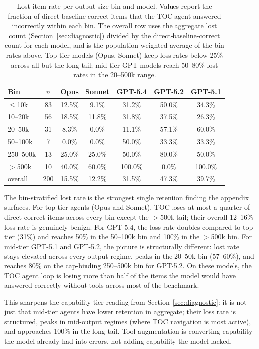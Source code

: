 \documentclass{article}
\begin{document}
\begin{table}[h]
\centering
\small
\setlength{\tabcolsep}{6pt}
\begin{tabular}{lcccccc}
\toprule
Bin & $n$ & Opus & Sonnet & GPT-5.4 & GPT-5.2 & GPT-5.1 \\
\midrule
$\le$10k & 83 & 12.5\% & 9.1\% & 31.2\% & 50.0\% & 34.3\% \\
10--20k & 56 & 18.5\% & 11.8\% & 31.8\% & 37.5\% & 26.3\% \\
20--50k & 31 & 8.3\% & 0.0\% & 11.1\% & 57.1\% & 60.0\% \\
50--100k & 7 & 0.0\% & 0.0\% & 50.0\% & 33.3\% & 33.3\% \\
250--500k & 13 & 25.0\% & 25.0\% & 50.0\% & 80.0\% & 50.0\% \\
$>$500k & 10 & 40.0\% & 60.0\% & 100.0\% & 0.0\% & 100.0\% \\
\midrule
overall & 200 & 15.5\% & 12.2\% & 31.5\% & 47.3\% & 39.7\% \\
\bottomrule
\end{tabular}
\caption{Lost-item rate per output-size bin and model. Values report the fraction of direct-baseline-correct items that the TOC agent answered incorrectly within each bin. The overall row uses the aggregate lost count (Section~\ref{sec:diagnostic}) divided by the direct-baseline-correct count for each model, and is the population-weighted average of the bin rates above. Top-tier models (Opus, Sonnet) keep loss rates below 25\% across all but the long tail; mid-tier GPT models reach 50--80\% lost rates in the 20--500k range.}
\label{tab:appendix-retention-by-bin}
\end{table}

The bin-stratified lost rate is the strongest single retention finding the appendix surfaces. For top-tier agents (Opus and Sonnet), TOC loses at most a quarter of direct-correct items across every bin except the $>$500k tail; their overall 12--16\% loss rate is genuinely benign. For GPT-5.4, the loss rate doubles compared to top-tier (31\%) and reaches 50\% in the 50--100k bin and 100\% in the $>$500k bin. For mid-tier GPT-5.1 and GPT-5.2, the picture is structurally different: lost rate stays elevated across every output regime, peaks in the 20--50k bin (57--60\%), and reaches 80\% on the cap-binding 250--500k bin for GPT-5.2. On these models, the TOC agent loop is losing more than half of the items the model would have answered correctly without tools across most of the benchmark.

This sharpens the capability-tier reading from Section~\ref{sec:diagnostic}: it is not just that mid-tier agents have lower retention in aggregate; their loss rate is structured, peaks in mid-output regimes (where TOC navigation is most active), and approaches 100\% in the long tail. Tool augmentation is converting capability the model already had into errors, not adding capability the model lacked.
\end{document}
